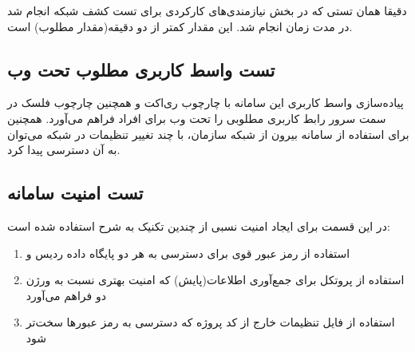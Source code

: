 دقیقا همان تستی که در بخش نیازمندی‌های کارکردی برای تست کشف شبکه انجام شد در مدت زمان  انجام شد. این مقدار کمتر از دو دقیقه(مقدار مطلوب) است.

\subsection{تست واسط کاربری مطلوب تحت وب}

پیاده‌سازی واسط کاربری این سامانه با چارچوب ری‌اکت و همچنین چارچوب فلسک در سمت سرور رابط کاربری مطلوبی را تحت وب برای افراد فراهم می‌آورد. همچنین برای استفاده از سامانه بیرون از شبکه سازمان، با چند تغییر تنظیمات در شبکه می‌توان به آن دسترسی پیدا کرد.

\subsection{تست امنیت سامانه }

در این قسمت برای ایجاد امنیت نسبی از چندین تکنیک به شرح استفاده شده است:

\begin{enumerate}
    \item استفاده از رمز عبور قوی برای دسترسی به هر دو پایگاه داده ردیس و  
    \item استفاده از پروتکل  برای جمع‌آوری اطلاعات(پایش) که امنیت بهتری نسبت به ورژن دو فراهم می‌آورد
    \item استفاده از فایل تنظیمات خارج از کد پروژه که دسترسی به رمز عبورها سخت‌تر شود

\end{enumerate}